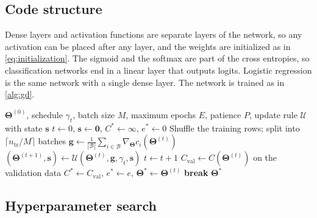 \subsection{Code structure}\label{subsec:code-structure}

Dense layers and activation functions are separate layers of the network, so any activation
can be placed after any layer, and the weights are initialized as in
\cref{eq:initialization}. The sigmoid
and the softmax are part of the cross entropies, so classification networks end in a linear
layer that outputs logits. Logistic regression is the same network with a single dense layer.
The network is trained as in \cref{alg:gd}.

\begin{algorithm}
    \caption{Training of the FFNN with minibatches, learning rate scheduling
    and early stopping}
    \label{alg:gd}
    {\small
    \begin{algorithmic}[1]
        \Require $\bm{\Theta}^{(0)}$, schedule $\gamma_t$, batch size $M$,
        maximum epochs $E$, patience $P$,
        update rule $\mathcal{U}$ with state $\bm{s}$
        \State $t \gets 0$, $\bm{s} \gets \bm{0}$, $C^* \gets \infty$, $e^* \gets 0$
            \State Shuffle the training rows; split into $\lceil n_\text{tr}/M\rceil$ batches
                \State $\bm{g} \gets \frac{1}{|\mathcal{B}|}\sum_{i\in\mathcal{B}}
                \nabla_{\bm{\Theta}} c_i(\bm{\Theta}^{(t)})$ 
                \State $(\bm{\Theta}^{(t+1)}, \bm{s}) \gets
                \mathcal{U}(\bm{\Theta}^{(t)}, \bm{g}, \gamma_t, \bm{s})$
                \State $t \gets t + 1$
            \EndFor
            \State $C_\text{val} \gets C(\bm{\Theta}^{(t)})$ on the validation data
                \State $C^* \gets C_\text{val}$, $e^* \gets e$, $\bm{\Theta}^* \gets \bm{\Theta}^{(t)}$
                \State \textbf{break}
            \EndIf
        \EndFor
        \State \Return $\bm{\Theta}^*$
    \end{algorithmic}
    }
\end{algorithm}

\subsection{Hyperparameter search}\label{subsec:hyperparameter-search}

